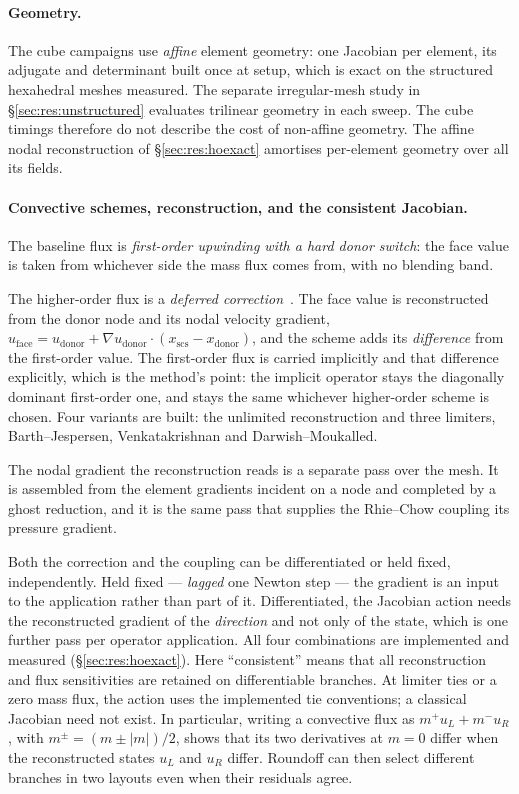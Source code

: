 \documentclass[sigconf,nonacm]{acmart}
\begin{document}
\paragraph{Geometry.} The cube campaigns use \emph{affine} element geometry: one
Jacobian per element, its adjugate and determinant built once at setup, which is exact on the
structured hexahedral meshes measured. The separate irregular-mesh study in \S\ref{sec:res:unstructured} evaluates
trilinear geometry in each sweep. The cube timings therefore do not describe the cost of non-affine geometry.
The affine nodal reconstruction of \S\ref{sec:res:hoexact} amortises
per-element geometry over all its fields.

\paragraph{Convective schemes, reconstruction, and the consistent Jacobian.} The baseline flux is
\emph{first-order upwinding with a hard donor switch}: the face value is taken from whichever
side the mass flux comes from, with no blending band.

The higher-order flux is a \emph{deferred
correction}~\cite{KhoslaRubin1974,XuePhanThienTanner2002}. The face value is reconstructed from
the donor node and its nodal velocity gradient,
$u_{\mathrm{face}} = u_{\mathrm{donor}} + \nabla u_{\mathrm{donor}}\cdot
 (x_{\mathrm{scs}} - x_{\mathrm{donor}})$,
and the scheme adds its \emph{difference} from the first-order value. The first-order flux is
carried implicitly and that difference explicitly, which is the method's point: the implicit
operator stays the diagonally dominant first-order one, and stays the same whichever
higher-order scheme is chosen. Four variants are built: the unlimited reconstruction and three
limiters, Barth--Jespersen, Venkatakrishnan and Darwish--Moukalled.

The nodal gradient the reconstruction reads is a separate pass over the mesh. It is assembled
from the element gradients incident on a node and completed by a ghost reduction, and it is the
same pass that supplies the Rhie--Chow coupling its pressure gradient.

Both the correction and the coupling can be differentiated or held fixed, independently. Held
fixed --- \emph{lagged} one Newton step --- the gradient is an input to the application rather
than part of it. Differentiated, the Jacobian action needs the reconstructed gradient of the
\emph{direction} and not only of the state, which is one further pass per operator
application. All four
combinations are implemented and measured (\S\ref{sec:res:hoexact}). Here ``consistent'' means
that all reconstruction and flux sensitivities are retained on differentiable branches.
At limiter ties or a zero mass flux, the action uses the implemented tie conventions;
a classical Jacobian need not exist. In particular, writing a convective flux as
$m^+ u_L + m^- u_R$, with $m^\pm=(m\pm|m|)/2$, shows that its two derivatives at
$m=0$ differ when the reconstructed states $u_L$ and $u_R$ differ. Roundoff can then
select different branches in two layouts even when their residuals agree.
\end{document}
